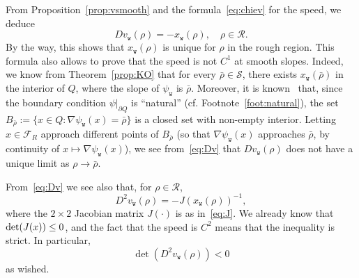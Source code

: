 \documentclass[AHL,Unicode,longabstracts,published]{cedram}
\newcommand{\psiw}{\psi_{\mathtt w}}
\newcommand{\ttw}{\mathtt{w}}
\newcommand{\clS}{\mathcal{S}}
\newcommand{\clR}{\mathcal{R}}
\newcommand{\clF}{\mathcal{F}}
\newcommand{\ttw}{\mathtt{w}}
\begin{document}
From Proposition~\ref{prop:vsmooth} and the formula~\eqref{eq:chiev} for the speed, we deduce
\begin{equation}\label{eq:Dv}
D v_{\ttw}(\rho)=-x_{\ttw}(\rho), \quad \rho\in\clR.
\end{equation}
By the way, this shows that $x_{\ttw}(\rho)$ is unique for $\rho$ in the rough region. This formula also allows to prove that the speed is not $C^1$ at smooth slopes. Indeed, we know from Theorem~\ref{prop:KO} that for every $\bar\rho\in \clS$, there exists $x_{\ttw}(\bar\rho)$ in the interior of $Q$, where the slope of $\psiw$ is $\bar\rho$. Moreover, it is known~\cite{Duse} that, since the boundary condition $\psi|_{\partial Q}$ is ``natural'' (cf. Footnote~\ref{foot:natural}), the set $B_{\bar \rho}:=\{x\in Q: \nabla\psiw(x)=\bar \rho\}$ is a closed set with non-empty interior. Letting $x\in \clF_R$ approach different points of $B_{\bar\rho}$ (so that $\nabla\psiw(x)$ approaches $\bar\rho$, by continuity of $x\mapsto \nabla\psiw(x)$), we see from~\eqref{eq:Dv} that $D v_{\ttw}(\rho)$ does not have a unique limit as $\rho\to\bar \rho$.

From~\eqref{eq:Dv} we see also that, for $\rho\in \clR$,
\begin{equation}\label{eq:implicit}
D^2 v_{\ttw}(\rho) = - J(x_{\ttw}(\rho))^{-1},
\end{equation}
where the $2\times 2$ Jacobian matrix $J(\cdot)$ is as in~\eqref{eq:J}. We already know that $\det(J(x))\linebreak\le0$, and the fact that the speed is $C^2$ means that the inequality is strict. In particular,
\begin{equation}
\det\left(D^2 v_{\ttw}(\rho)\right)<0
\end{equation}
as wished.
\end{document}
